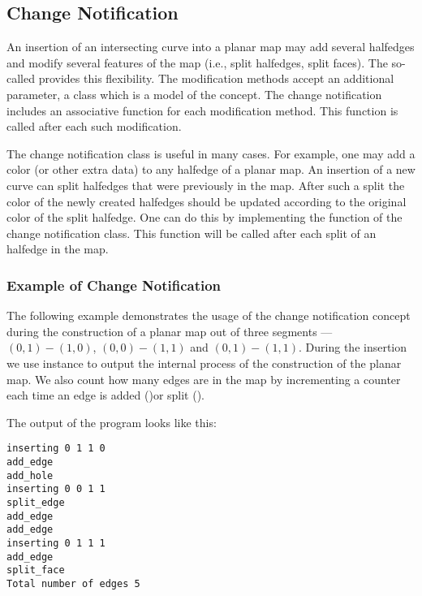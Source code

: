 \begin{ccAdvanced}
\subsection*{Change Notification}
  An insertion of an intersecting curve into a planar map may add
  several halfedges and modify several features of the map (i.e.,
  split halfedges, split faces). The so-called  provides this flexibility. The modification methods
  accept an additional parameter, a class which is a model of the
   concept. The
  change notification includes an associative function for each
  modification method.  This function is called after each such
  modification.

  The change notification class is useful in many cases. For example,
  one may add a color (or other extra data) to any halfedge of a
  planar map. An insertion of a new curve can split halfedges that
  were previously in the map. After such a split the color of the
  newly created halfedges should be updated according to the original
  color of the split halfedge. One can do this by implementing the
   function of the change notification class. This
  function will be called after each split of an halfedge in the map.

\subsubsection{Example of Change Notification}
\label{ssecn:example2}
The following example demonstrates the usage of the change
notification concept during the construction of a
planar map out of three segments --- $(0,1)-(1,0)$, $(0,0)-(1,1)$
and $(0,1)-(1,1)$.
During the insertion we use  instance to
output the internal process of the construction of the planar map.
We also count how many edges are in the map by incrementing a
counter each time an edge is added ()or
split ().


The output of the program looks like this:
\begin{verbatim}
inserting 0 1 1 0
add_edge
add_hole
inserting 0 0 1 1
split_edge
add_edge
add_edge
inserting 0 1 1 1
add_edge
split_face
Total number of edges 5
\end{verbatim}

\end{ccAdvanced}



